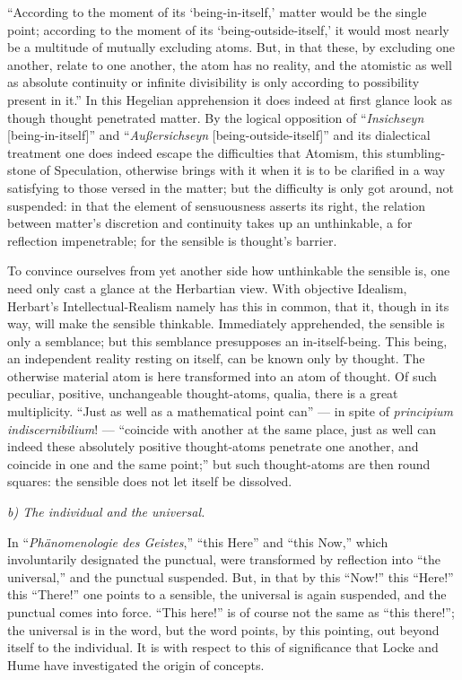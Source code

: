 \documentclass[12pt]{book}
\begin{document}
``According to the moment of its `being-in-itself,' matter would be the single
point; according to the moment of its `being-outside-itself,' it would most nearly
be a multitude of mutually excluding atoms. But, in that these, by excluding one
another, relate to one another, the atom has no reality, and the atomistic as well
as absolute continuity or infinite divisibility is only according to possibility
present in it.'' In this Hegelian apprehension it does indeed at first glance look
as though thought penetrated matter. By the logical opposition of
``\textit{Insichseyn} [being-in-itself]'' and ``\textit{Außersichseyn}
[being-outside-itself]'' and its dialectical treatment one does indeed escape the
difficulties that Atomism, this stumbling-stone of Speculation, otherwise brings
with it when it is to be clarified in a way satisfying to those versed in the
matter; but the difficulty is only got around, not suspended: in that the element
of sensuousness asserts its right, the relation between matter's discretion and
continuity takes up an unthinkable, a for
reflection impenetrable; for the sensible is thought's barrier.

To convince ourselves from yet another side how unthinkable the sensible is, one
need only cast a glance at the Herbartian view. With objective Idealism, Herbart's
Intellectual-Realism namely has this in common, that it, though in its way, will
make the sensible thinkable. Immediately apprehended, the sensible is only a
semblance; but this semblance presupposes an in-itself-being. This being, an
independent reality resting on itself, can be known only by thought. The otherwise
material atom is here transformed into an atom of thought. Of such peculiar,
positive, unchangeable thought-atoms, qualia, there is a great multiplicity.
``Just as well as a mathematical point can'' — in spite of \textit{principium
indiscernibilium}! — ``coincide with another at the same place, just as well can
indeed these absolutely positive thought-atoms penetrate one another, and coincide
in one and the same point;''
but such thought-atoms are then round squares: the sensible does not let itself be
dissolved.

\emph{b) The individual and the universal.}

In ``\textit{Phänomenologie des Geistes},'' ``this Here'' and ``this Now,'' which
involuntarily designated the punctual, were transformed by reflection into ``the
universal,'' and the punctual suspended. But, in that by this ``Now!'' this
``Here!'' this ``There!'' one points to a sensible, the universal is again
suspended, and the punctual comes into force. ``This here!'' is of course not the
same as ``this there!''; the universal is in the word, but the word points, by
this pointing, out beyond itself to the individual. It is with respect to this of
significance that Locke and Hume have investigated the origin of concepts.
\end{document}
